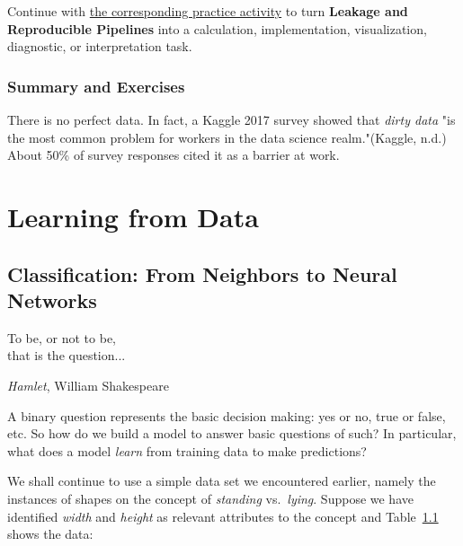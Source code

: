 \documentclass[
  letterpaper,
]{scrbook}
\begin{document}
\begin{tcolorbox}[enhanced jigsaw, arc=.35mm, bottomrule=.15mm, bottomtitle=1mm, breakable, colback=white, colbacktitle=quarto-callout-tip-color!10!white, colframe=quarto-callout-tip-color-frame, coltitle=black, left=2mm, leftrule=.75mm, opacityback=0, opacitybacktitle=0.6, rightrule=.15mm, title=\textcolor{quarto-callout-tip-color}{\faLightbulb}\hspace{0.5em}{Put it into practice}, titlerule=0mm, toprule=.15mm, toptitle=1mm]

Continue with
\hyperref[sec-pr-06-leakage-and-reproducible-pipelines]{the
corresponding practice activity} to turn \textbf{Leakage and
Reproducible Pipelines} into a calculation, implementation,
visualization, diagnostic, or interpretation task.

\end{tcolorbox}

\section{Summary and Exercises}\label{summary-and-exercises}

There is no perfect data. In fact, a Kaggle 2017 survey showed that
\emph{dirty data} "is the most common problem for workers in the data
science realm."(Kaggle, n.d.) About 50\% of survey responses cited it as
a barrier at work.

\part{Learning from Data}

\chapter{Classification: From Neighbors to Neural
Networks}\label{ch-classification}

To be, or not to be,\\
that is the question...

\emph{Hamlet}, William Shakespeare

A binary question represents the basic decision making: yes or no, true
or false, etc. So how do we build a model to answer basic questions of
such? In particular, what does a model \emph{learn} from training data
to make predictions?

We shall continue to use a simple data set we encountered earlier,
namely the instances of shapes on the concept of \emph{standing}
vs.~\emph{lying}. Suppose we have identified \emph{width} and
\emph{height} as relevant attributes to the concept and
Table~\hyperref[tab-bin-shapes]{1.1} shows the data:
\end{document}
